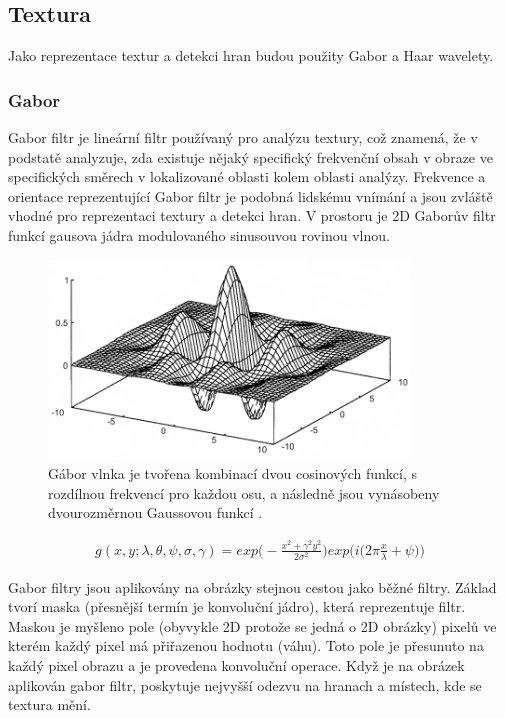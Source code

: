 \documentclass[czech,BP]{thesiskiv}
\begin{document}
\subsection{Textura}
Jako reprezentace textur a detekci hran budou použity Gabor a Haar wavelety. 

\subsubsection{Gabor}
Gabor filtr je lineární filtr používaný pro analýzu textury, což znamená, že v podstatě analyzuje, zda existuje nějaký specifický frekvenční obsah v obraze ve specifických směrech v lokalizované oblasti kolem oblasti analýzy. Frekvence a orientace reprezentující Gabor filtr je podobná lidskému vnímání a jsou zvláště vhodné pro reprezentaci textury a detekci hran. V prostoru je 2D Gaborův filtr funkcí gausova jádra modulovaného sinusouvou rovinou vlnou.

\begin{figure}[ht]
		\centering
		\includegraphics[height=200px]{./img/gabor.png}
		\caption{Gábor vlnka je tvořena kombinací dvou cosinových funkcí, s rozdílnou frekvencí pro každou osu, a následně jsou vynásobeny dvourozměrnou Gaussovou funkcí \cite{Gabor}.} 					
\end{figure}

\begin{align}
   \label{gabor_complex}  g(x, y; \lambda, \theta, \psi, \sigma,  \gamma) = exp \Bigg( - \frac{{x^2 + \gamma^2 y^2}}{2 \sigma^2} \Bigg) exp \Bigg(i \bigg(2\pi \frac{x}{\lambda} + \psi \bigg)\Bigg)  
\end{align}

Gabor filtry jsou aplikovány na obrázky stejnou cestou jako běžné filtry. Základ tvorí maska (přesnější termín je konvoluční jádro), která reprezentuje filtr. Maskou je myšleno pole (obyvykle 2D protože se jedná o 2D obrázky) pixelů ve kterém každý pixel má přiřazenou hodnotu (váhu). Toto pole je přesunuto na každý pixel obrazu a je provedena konvoluční operace.
Když je na obrázek aplikován gabor filtr, poskytuje nejvyšší odezvu na hranach a místech, kde se textura mění. 
\end{document}

